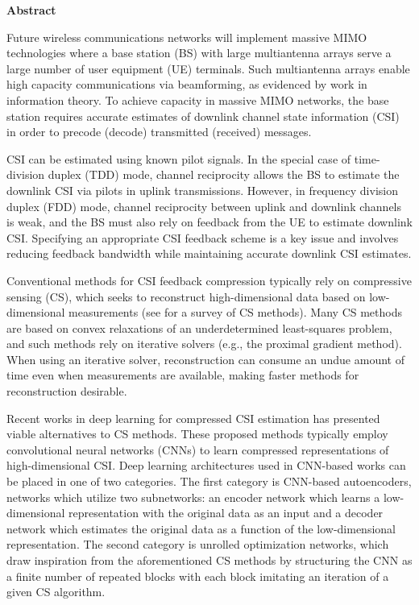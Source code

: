 \newpage
{\baselineskip 14pt   } \vspace{27pt}
\centerline{\Huge \bf {Abstract}} \vspace{18pt}

Future wireless communications networks will implement massive MIMO technologies where a base station (BS) with large multiantenna arrays serve a large number of user equipment (UE) terminals. Such multiantenna arrays enable high capacity communications via beamforming, as evidenced by work in information theory. To achieve capacity in massive MIMO networks, the base station requires accurate estimates of downlink channel state information (CSI) in order to precode (decode) transmitted (received) messages.

CSI can be estimated using known pilot signals. In the special case of time-division duplex (TDD) mode, channel reciprocity allows the BS to estimate the downlink CSI via pilots in uplink transmissions. However, in frequency division duplex (FDD) mode, channel reciprocity between uplink and downlink channels is weak, and the BS must also rely on feedback from the UE to estimate downlink CSI. Specifying an appropriate CSI feedback scheme is a key issue and involves reducing feedback bandwidth while maintaining accurate downlink CSI estimates.

Conventional methods for CSI feedback compression typically rely on compressive sensing (CS), which seeks to reconstruct high-dimensional data based on low-dimensional measurements (see for a survey of CS methods). Many CS methods are based on convex relaxations of an underdetermined least-squares problem, and such methods rely on iterative solvers (e.g., the proximal gradient method). When using an iterative solver, reconstruction can consume an undue amount of time even when measurements are available, making faster methods for reconstruction desirable.

Recent works in deep learning for compressed CSI estimation has presented viable alternatives to CS methods. These proposed methods typically employ convolutional neural networks (CNNs) to learn compressed representations of high-dimensional CSI. Deep learning architectures used in CNN-based works can be placed in one of two categories. The first category is CNN-based autoencoders, networks which utilize two subnetworks: an encoder network which learns a low-dimensional representation with the original data as an input and a decoder network which estimates the original data as a function of the low-dimensional representation. The second category is unrolled optimization networks, which draw inspiration from the aforementioned CS methods by structuring the CNN as a finite number of repeated blocks with each block imitating an iteration of a given CS algorithm.

